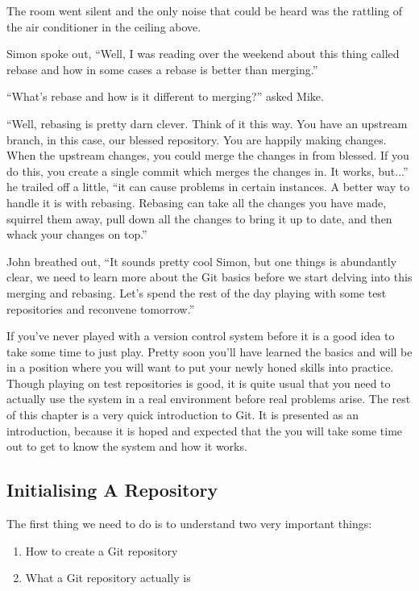 \begin{trenches}
The room went silent and the only noise that could be heard was the rattling of the air conditioner in the ceiling above. 

Simon spoke out, ``Well, I was reading over the weekend about this thing called rebase and how in some cases a rebase is better than merging.''

``What's rebase and how is it different to merging?'' asked Mike. 

``Well, rebasing is pretty darn clever.  Think of it this way.  You have an upstream branch, in this case, our blessed repository.  You are happily making changes.  When the upstream changes, you could merge the changes in from blessed.  If you do this, you create a single commit which merges the changes in.  It works, but...'' he trailed off a little, ``it can cause problems in certain instances.  A better way to handle it is with rebasing.  Rebasing can take all the changes you have made, squirrel them away, pull down all the changes to bring it up to date, and then whack your changes on top.''

John breathed out, ``It sounds pretty cool Simon, but one things is abundantly clear, we need to learn more about the Git basics before we start delving into this merging and rebasing.  Let's spend the rest of the day playing with some test repositories and reconvene tomorrow.''
\end{trenches}

If you've never played with a version control system before it is a good idea to take some time to just play.  Pretty soon you'll have learned the basics and will be in a position where you will want to put your newly honed skills into practice.  Though playing on test repositories is good, it is quite usual that you need to actually use the system in a real environment before real problems arise.  The rest of this chapter is a very quick introduction to Git.  It is presented as an introduction, because it is hoped and expected that the you will take some time out to get to know the system and how it works. 

\subsection{Initialising A Repository}
The first thing we need to do is to understand two very important things: 

\begin{enumerate}
  \item How to create a Git repository 
  \item What a Git repository actually is 
\end{enumerate}

